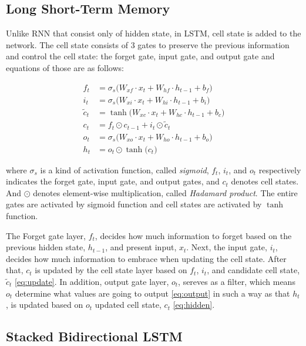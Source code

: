 \documentclass[letterpaper, 10 pt, conference]{ieeeconf}  %
\begin{document}
\subsection{Long Short-Term Memory}

Unlike RNN that consist only of hidden state, in LSTM, cell state is added to the network. The cell state consists of 3 gates to preserve the previous information and control the cell state: the forget gate, input gate, and output gate and equations of those are as follows:


\begin{align}
f_{t} & =\sigma _{s}\big(W_{xf}\cdot x_{t}+W_{hf}\cdot h_{t-1}+b_{f}\big)\label{eq:forget}\\
i_{t} & =\sigma _{s}\big(W_{xi}\cdot x_{t}+W_{hi}\cdot h_{t-1}+b_{i}\big)\label{eq:input}\\
\tilde{c}_{t} & = \tanh\big(W_{xc}\cdot x_{t}+W_{hc}\cdot h_{t-1}+b_{c}\big)\label{eq:new_cell}\\
c_{t} & =f_{t}\odot c_{t-1}+i_{t}\odot\tilde{c}_{t}\label{eq:update}\\
o_{t} & =\sigma _{s}\big(W_{xo}\cdot x_{t}+W_{ho}\cdot h_{t-1}+b_{o}\big)\label{eq:output}\\
h_{t} & =o_{t}\odot \tanh\big(c_{t}\big)\label{eq:hidden}
\end{align}

where $\sigma _{s}$ is a kind of activation function, called \textit{sigmoid},  $f_{t}$, $i_{t}$, and $o_{t}$ respectively indicates the forget gate, input gate, and output gates, and $c_{t}$ denotes cell states. And $\odot$ denotes element-wise multiplication, called \textit{Hadamard product}. The entire gates are activated by sigmoid function and cell states are activated by $\tanh$ function.

The Forget gate layer, $f_{t}$, decides how much information to forget based on the previous hidden state, $h_{t-1}$, and present input, $x_{t}$. Next, the input gate, $i_{t}$, decides how much information to embrace when updating the cell state. After that, $c_{t}$ is updated by the cell state layer based on $f_{t}$, $i_{t}$, and candidate cell state, $\tilde{c}_{t}$ \eqref{eq:update}. In addition, output gate layer, $o_{t}$, sereves as a filter, which means $o_{t}$ determine what values are going to output \eqref{eq:output} in such a way as that $h_{t}$, is updated based on $o_{t}$ updated cell state, $c_{t}$ \eqref{eq:hidden}. 

\subsection{Stacked Bidirectional LSTM}
\end{document}
